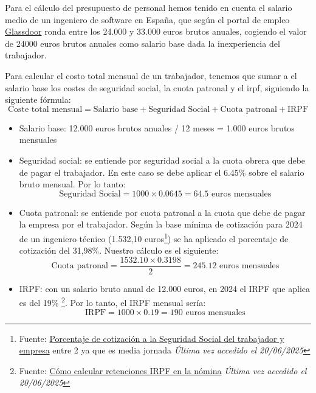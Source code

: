 Para el cálculo del presupuesto de personal hemos tenido en cuenta el salario medio de un ingeniero de software en España, que según el portal de empleo \href{https://www.glassdoor.es/Sueldos/granada-software-engineer-sueldo-SRCH_IL.0,7_IC2614045_KO8,25.htm}{Glassdoor} ronda entre los 24.000 y 33.000 euros brutos anuales, cogiendo el valor de 24000 euros brutos anuales como salario base dada la inexperiencia del trabajador.

Para calcular el costo total mensual de un trabajador, tenemos que sumar a el salario base los costes de seguridad social, la cuota patronal y el \acrshort{irpf}, siguiendo la siguiente fórmula:
\begin{equation}
    \text{Coste total mensual} = \text{Salario base} + \text{Seguridad Social} + \text{Cuota patronal} + \text{IRPF}
\end{equation}
\begin{itemize}
    \item Salario base: 12.000 euros brutos anuales / 12 meses = 1.000 euros brutos mensuales
    \item Seguridad social: se entiende por seguridad social a la cuota obrera que debe de pagar el trabajador. En este caso se debe aplicar el 6.45\% sobre el salario bruto mensual. Por lo tanto:
        \begin{equation}
            \text{Seguridad Social} = 1000 \times 0.0645 = 64.5 \text{ euros mensuales}
        \end{equation}
    \item Cuota patronal: se entiende por cuota patronal a la cuota que debe de pagar la empresa por el trabajador.
        Según la base mínima de cotización para 2024 de un ingeniero técnico (1.532,10 euros\footnote{Fuente: \href{https://www.cuestioneslaborales.es/porcentaje-de-cotizacion-a-la-seguridad-social-del-trabajador-y-empresa/}{Porcentaje de cotización a la Seguridad Social del trabajador y empresa} entre 2 ya que es media jornada\textit{ Última vez accedido el 20/06/2025 }}) se ha aplicado el porcentaje de cotización del 31,98\%.
        Nuestro cálculo es el siguiente:
        \begin{equation}
            \text{Cuota patronal} = \dfrac{1532.10 \times 0.3198}{2} = 245.12 \text{ euros mensuales}
        \end{equation}
    \item IRPF: con un salario bruto anual de 12.000 euros, en 2024 el IRPF que aplica es del 19\% \footnote{Fuente: \href{https://www.bankinter.com/blog/finanzas-personales/como-calcular-retenciones-irpf-nomina\#tabla-retenciones}{Cómo calcular retenciones IRPF en la nómina}\textit{ Última vez accedido el 20/06/2025 }}.
        Por lo tanto, el IRPF mensual sería:
        \begin{equation}
            \text{IRPF} = 1000 \times 0.19 = 190 \text{ euros mensuales}
        \end{equation}
\end{itemize}

